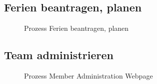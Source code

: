 \subsection{Ferien beantragen, planen}\label{prozess:ferien}
 \begin{figure}[H]
  	\centering
 	\caption{Prozess Ferien beantragen, planen}
\end{figure}


\subsection{Team administrieren}\label{prozess:team}
 \begin{figure}[H]
  	\centering
 	\caption{Prozess Member Administration Webpage}
\end{figure}


